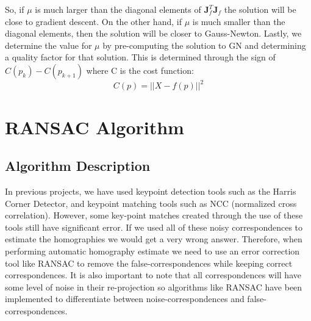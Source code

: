 \documentclass{article}
\begin{document}
So, if $\mu$ is much larger than the diagonal elements of \(\boldsymbol{J}_f^T \boldsymbol{J}_f\) the solution will be close to gradient descent. On the other hand, if $\mu$ is much smaller than the diagonal elements, then the solution will be closer to Gauss-Newton. Lastly, we determine the value for $\mu$ by pre-computing the solution to GN and determining a quality factor for that solution. This is determined through the sign of \(C (p_k) - C (p_{k+1})\) where C is the cost function: 
\[C(p) = ||X - f(p)||^2\]

\section{RANSAC Algorithm}
\subsection{Algorithm Description}
In previous projects, we have used keypoint detection tools such as the Harris Corner Detector, and keypoint matching tools such as NCC (normalized cross correlation). However, some key-point matches created through the use of these tools still have significant error. If we used all of these noisy correspondences to estimate the homographies we would get a very wrong answer. Therefore, when performing automatic homography estimate we need to use an error correction tool like RANSAC to remove the false-correspondences while keeping correct correspondences. It is also important to note that all correspondences will have some level of noise in their re-projection so algorithms like RANSAC have been implemented to differentiate between noise-correspondences and false-correspondences.
\end{document}
